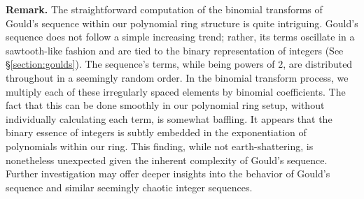 \documentclass{article}
\theoremstyle{plain}
\theoremstyle{definition}
\begin{document}
\textbf{Remark.}
The straightforward computation of the binomial transforms of Gould's sequence within our polynomial ring structure is quite intriguing. Gould's sequence does not follow a simple increasing trend; rather, its terms oscillate in a sawtooth-like fashion and are tied to the binary representation of integers (See \S\ref{section:goulds}). The sequence's terms, while being powers of $2$, are distributed throughout in a seemingly random order. In the binomial transform process, we multiply each of these irregularly spaced elements by binomial coefficients. The fact that this can be done smoothly in our polynomial ring setup, without individually calculating each term, is somewhat baffling. It appears that the binary essence of integers is subtly embedded in the exponentiation of polynomials within our ring. This finding, while not earth-shattering, is nonetheless unexpected given the inherent complexity of Gould's sequence. Further investigation may offer deeper insights into the behavior of Gould's sequence and similar seemingly chaotic integer sequences.

\begingroup
\raggedright


\endgroup
\end{document}
